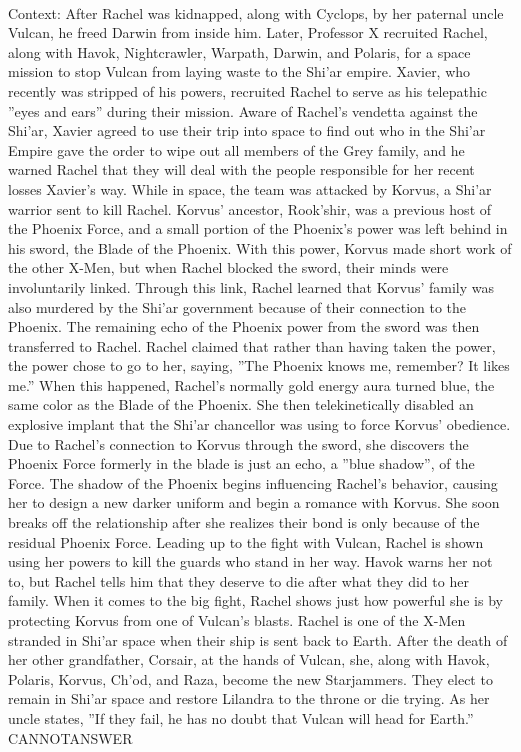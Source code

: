 \documentclass[11pt,a4paper, onecolumn]{article}
\begin{document}
\\ Context: After Rachel was kidnapped, along with Cyclops, by her paternal uncle Vulcan, he freed Darwin from inside him. Later, Professor X recruited Rachel, along with Havok, Nightcrawler, Warpath, Darwin, and Polaris, for a space mission to stop Vulcan from laying waste to the Shi'ar empire. Xavier, who recently was stripped of his powers, recruited Rachel to serve as his telepathic ''eyes and ears'' during their mission. Aware of Rachel's vendetta against the Shi'ar, Xavier agreed to use their trip into space to find out who in the Shi'ar Empire gave the order to wipe out all members of the Grey family, and he warned Rachel that they will deal with the people responsible for her recent losses Xavier's way. While in space, the team was attacked by Korvus, a Shi'ar warrior sent to kill Rachel. Korvus' ancestor, Rook'shir, was a previous host of the Phoenix Force, and a small portion of the Phoenix's power was left behind in his sword, the Blade of the Phoenix. With this power, Korvus made short work of the other X-Men, but when Rachel blocked the sword, their minds were involuntarily linked. Through this link, Rachel learned that Korvus' family was also murdered by the Shi'ar government because of their connection to the Phoenix. The remaining echo of the Phoenix power from the sword was then transferred to Rachel. Rachel claimed that rather than having taken the power, the power chose to go to her, saying, ''The Phoenix knows me, remember? It likes me.'' When this happened, Rachel's normally gold energy aura turned blue, the same color as the Blade of the Phoenix. She then telekinetically disabled an explosive implant that the Shi'ar chancellor was using to force Korvus' obedience. Due to Rachel's connection to Korvus through the sword, she discovers the Phoenix Force formerly in the blade is just an echo, a ''blue shadow'', of the Force. The shadow of the Phoenix begins influencing Rachel's behavior, causing her to design a new darker uniform and begin a romance with Korvus. She soon breaks off the relationship after she realizes their bond is only because of the residual Phoenix Force. Leading up to the fight with Vulcan, Rachel is shown using her powers to kill the guards who stand in her way. Havok warns her not to, but Rachel tells him that they deserve to die after what they did to her family. When it comes to the big fight, Rachel shows just how powerful she is by protecting Korvus from one of Vulcan's blasts. Rachel is one of the X-Men stranded in Shi'ar space when their ship is sent back to Earth. After the death of her other grandfather, Corsair, at the hands of Vulcan, she, along with Havok, Polaris, Korvus, Ch'od, and Raza, become the new Starjammers. They elect to remain in Shi'ar space and restore Lilandra to the throne or die trying. As her uncle states, ''If they fail, he has no doubt that Vulcan will head for Earth.'' CANNOTANSWER
\end{document}
